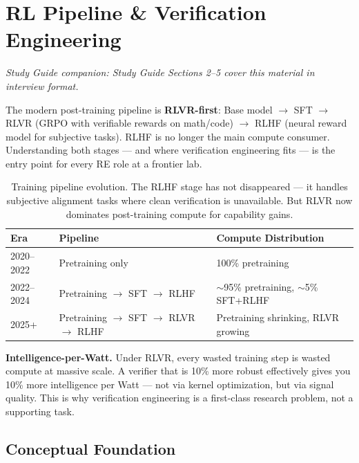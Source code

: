 \newpage
\section{RL Pipeline \& Verification Engineering}

\smallskip\noindent\textit{Study Guide companion: Study Guide Sections 2--5 cover this material in interview format.}
\smallskip

The modern post-training pipeline is \textbf{RLVR-first}: Base model $\to$ SFT $\to$ RLVR (GRPO with verifiable rewards on math/code) $\to$ RLHF (neural reward model for subjective tasks). RLHF is no longer the main compute consumer. Understanding both stages --- and where verification engineering fits --- is the entry point for every RE role at a frontier lab.

\begin{table}[h]
\centering
\begin{tabular}{@{}lll@{}}
\toprule
\textbf{Era} & \textbf{Pipeline} & \textbf{Compute Distribution} \\
\midrule
2020--2022 & Pretraining only & 100\% pretraining \\
2022--2024 & Pretraining $\to$ SFT $\to$ RLHF & $\sim$95\% pretraining, $\sim$5\% SFT+RLHF \\
2025+ & Pretraining $\to$ SFT $\to$ RLVR $\to$ RLHF & Pretraining shrinking, RLVR growing \\
\bottomrule
\end{tabular}
\caption{Training pipeline evolution. The RLHF stage has not disappeared --- it handles subjective alignment tasks where clean verification is unavailable. But RLVR now dominates post-training compute for capability gains.}
\end{table}

\textbf{Intelligence-per-Watt.} Under RLVR, every wasted training step is wasted compute at massive scale. A verifier that is 10\% more robust effectively gives you 10\% more intelligence per Watt --- not via kernel optimization, but via signal quality. This is why verification engineering is a first-class research problem, not a supporting task.

\subsection{Conceptual Foundation}

